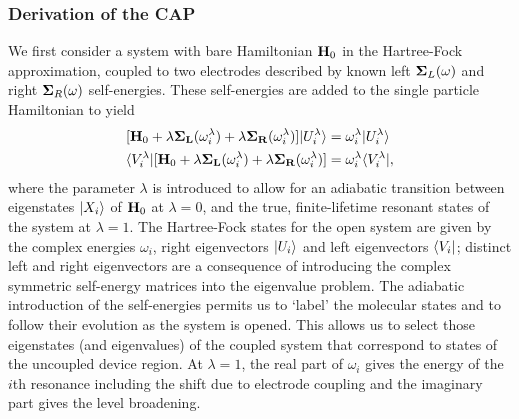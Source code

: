 \subsubsection{Derivation of the \ac{CAP}}
We first consider a system with bare Hamiltonian $\mathbf{H}_0$ in the
Hartree-Fock approximation, coupled to two electrodes described by known
left $\mathbf{\Sigma}_L(\omega)$ and right $\mathbf{\Sigma}_R(\omega)$ self-energies.
These self-energies are added to the single particle
Hamiltonian to yield
\numparts
\begin{eqnarray}
\label{eq:capseq}
        [\mathbf{H}_0 + \lambda \mathbf{\Sigma_L}(\omega_i^\lambda)
            +\lambda \mathbf{\Sigma_R}(\omega_i^\lambda)] |U_i^\lambda \rangle
        &= \omega_i^\lambda |U_i^\lambda \rangle \\
        \langle V_i^\lambda| [\mathbf{H}_0 + \lambda \mathbf{\Sigma_L}(\omega_i^\lambda)
            +\lambda \mathbf{\Sigma_R}(\omega_i^\lambda)]
        &= \omega_i^\lambda \langle V_i^\lambda|,
        \label{eq:adiabaticap}
\end{eqnarray}
\endnumparts
where the parameter $\lambda$ is introduced to allow for an adiabatic
transition between eigenstates $|X_i \rangle$ of $\mathbf{H}_0$ at $\lambda = 0$,
and the true, finite-lifetime resonant states of the system at
$\lambda = 1$. The Hartree-Fock states for the open system are given by
the complex energies $\omega_i$, right eigenvectors $|U_i \rangle$ and left
eigenvectors $\langle V_i|$; distinct left and right eigenvectors are a
consequence of introducing the complex symmetric self-energy matrices into
the eigenvalue problem.
The adiabatic introduction of the self-energies permits
us to `label' the molecular states and to follow their evolution as the
system is opened. This allows us to select those eigenstates (and
eigenvalues) of the coupled system that correspond to states of the
uncoupled device region. At $\lambda=1$, the real part of $\omega_i$
gives the energy of the $i$th resonance including the shift due to
electrode coupling and the imaginary part gives the level broadening.

